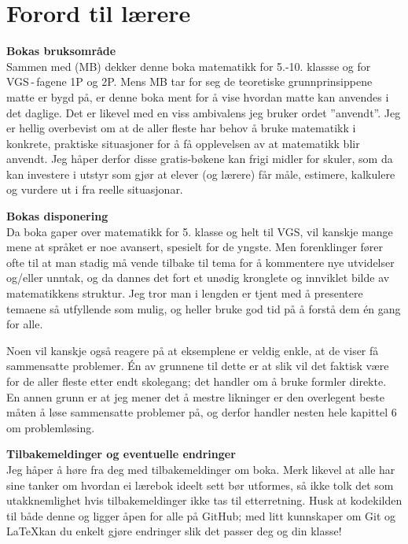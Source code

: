 


\newpage
\section*{Forord til lærere}
\textbf{Bokas bruksområde}\\
Sammen med  (MB) dekker denne boka matematikk for 5.-10. klassse og for VGS\,-\,fagene 1P og 2P. Mens MB tar for seg de teoretiske grunnprinsippene matte er bygd på, er denne boka ment for å vise hvordan matte kan anvendes i det daglige. Det er likevel med en viss ambivalens jeg bruker ordet ''anvendt''. Jeg er hellig overbevist om at de aller fleste har behov å bruke matematikk i konkrete, praktiske situasjoner for å få opplevelsen av at matematikk blir anvendt. Jeg håper derfor disse gratis-bøkene kan frigi midler for skuler, som da kan investere i utstyr som gjør at elever (og lærere) får måle, estimere, kalkulere og vurdere ut i fra reelle situasjonar.\vsk

\textbf{Bokas disponering} \\
Da boka gaper over matematikk for 5. klasse og helt til VGS, vil kanskje mange mene at språket er noe avansert, spesielt for de yngste. Men forenklinger fører ofte til at man stadig må vende tilbake til tema for å kommentere nye utvidelser og/eller unntak, og da dannes det fort et unødig kronglete og innviklet bilde av matematikkens struktur. Jeg tror man i lengden er tjent med å presentere temaene så utfyllende som mulig, og heller bruke god tid på å forstå dem én gang for alle.\vsk

Noen vil kanskje også reagere på at eksemplene er veldig enkle, at de viser få sammensatte problemer. Én av grunnene til dette er at slik vil det faktisk være for de aller fleste etter endt skolegang; det handler om å bruke formler direkte. En annen grunn er at jeg mener det å mestre likninger er den overlegent beste måten å løse sammensatte problemer på, og derfor handler nesten hele kapittel 6 om problemløsing.\vsk

\textbf{Tilbakemeldinger og eventuelle endringer} \\
Jeg håper å høre fra deg med tilbakemeldinger om boka. Merk likevel at alle har sine tanker om hvordan ei lærebok ideelt sett bør utformes, så ikke tolk det som utakknemlighet hvis tilbakemeldinger ikke tas til etterretning. Husk at kodekilden til både denne  og \mb\;ligger åpen for alle på GitHub; med litt kunnskaper om Git og \LaTeX\;kan du enkelt gjøre endringer slik det passer deg og din klasse!


